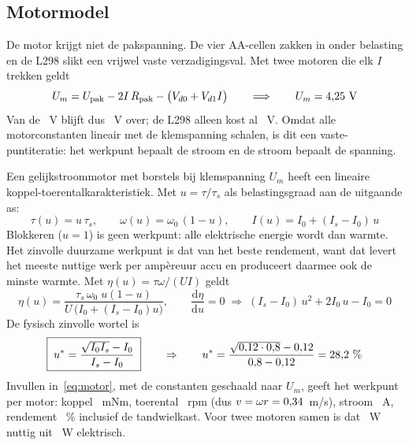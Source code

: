 \documentclass[10pt,a4paper]{article}
\begin{document}
\subsection{Motormodel}
De motor krijgt niet de pakspanning. De vier AA-cellen zakken in onder belasting en de
L298 slikt een vrijwel vaste verzadigingsval. Met twee motoren die elk $I$ trekken geldt
\begin{equation}
U_m = U_{\text{pak}} - 2I\,R_{\text{pak}} - \bigl(V_{d0} + V_{d1}I\bigr)
\qquad\Longrightarrow\qquad U_m = 4{,}25~\text{V}
\label{eq:voeding}
\end{equation}
Van de \RUpack~V blijft dus \RUm~V over; de L298 alleen kost al \RVdrop~V. Omdat alle
motorconstanten lineair met de klemspanning schalen, is dit een vaste-puntiteratie: het
werkpunt bepaalt de stroom en de stroom bepaalt de spanning.

Een gelijkstroommotor met borstels bij klemspanning $U_m$ heeft een lineaire
koppel-toerentalkarakteristiek. Met $u = \tau/\tau_s$ als belastingsgraad aan de uitgaande as:
\begin{equation}
\tau(u) = u\,\tau_s, \qquad
\omega(u) = \omega_0\,(1-u), \qquad
I(u) = I_0 + (I_s - I_0)\,u
\label{eq:motor}
\end{equation}
Blokkeren ($u=1$) is geen werkpunt: alle elektrische energie wordt dan warmte. Het zinvolle
duurzame werkpunt is dat van het beste rendement, want dat levert het meeste nuttige werk per
ampère\-uur accu en produceert daarmee ook de minste warmte. Met
$\eta(u) = \tau\omega/(UI)$ geldt
\begin{equation}
\eta(u) = \frac{\tau_s\,\omega_0\;u(1-u)}{U\,\bigl(I_0 + (I_s-I_0)u\bigr)},
\qquad
\frac{\mathrm{d}\eta}{\mathrm{d}u} = 0
\;\Longrightarrow\;
(I_s-I_0)\,u^2 + 2I_0\,u - I_0 = 0
\label{eq:eta}
\end{equation}
De fysisch zinvolle wortel is
\begin{equation}
\boxed{\;u^* = \frac{\sqrt{I_0 I_s} - I_0}{I_s - I_0}\;}
\qquad\Rightarrow\qquad
u^* = \frac{\sqrt{0{,}12 \cdot 0{,}8} - 0{,}12}{0{,}8 - 0{,}12} = 28{,}2~\%
\label{eq:ustar}
\end{equation}
Invullen in~\eqref{eq:motor}, met de constanten geschaald naar $U_m$, geeft het werkpunt per
motor: koppel \RtauCont~mNm, toerental \RnCont~rpm (dus $v = \omega r = 0{,}34$~m/s),
stroom \RIcontEen~A, rendement \RetaCont~\% inclusief de tandwielkast. Voor twee motoren
samen is dat \RPmechCont~W nuttig uit \RPelekCont~W elektrisch.
\end{document}

